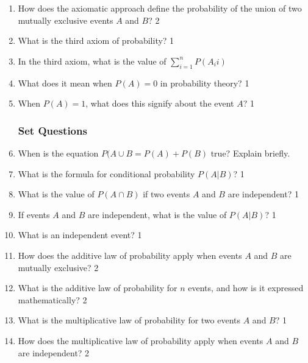 \documentclass[a4paper,oneside, margin=1.4in]{book}
\begin{document}
\begin{enumerate}
\item How does the axiomatic approach define the probability of the union of two mutually exclusive events \( A \) and \( B \)? \hfill 2

\item What is the third axiom of probability? \hfill 1

\item In the third axiom, what is the value of $\displaystyle \sum_{i=1}^n P(A_ii)$

\item What does it mean when \( P(A) = 0 \) in probability theory? \hfill 1

\item When \( P(A) = 1 \), what does this signify about the event \( A \)? \hfill 1

\subsubsection{Set Questions}

\item When is the equation $P(A \cup B = P(A) + P(B)$ true? Explain briefly.

\item What is the formula for conditional probability \( P(A|B) \)? \hfill 1

\item What is the value of $P(A \cap B)$ if two events \( A \) and \( B \) are independent? \hfill 1

\item If events \( A \) and \( B \) are independent, what is the value of \( P(A|B) \)? \hfill 1

\item What is an independent event? \hfill 1

\item How does the additive law of probability apply when events \( A \) and \( B \) are mutually exclusive? \hfill 2

\item What is the additive law of probability for \( n \) events, and how is it expressed mathematically? \hfill 2

\item What is the multiplicative law of probability for two events \( A \) and \( B \)? \hfill 1

\item How does the multiplicative law of probability apply when events \( A \) and \( B \) are independent? \hfill 2


\end{enumerate}
\end{document}
